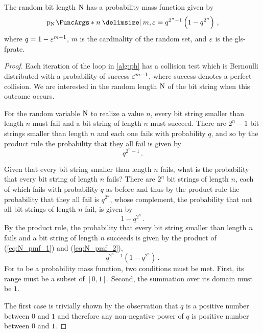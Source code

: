 \documentclass[ ../main.tex]{subfiles}
\begin{document}
\begin{theorem}
The random bit length $\mathrm{N}$ has a probability mass function given by
\begin{equation}
\label{eq:N_pmf}
    \PDF{n \Given m, \fprate}[\RV{N}] = q^{2^n-1}\left(1 - q^{2^n}\right)\,,
\end{equation}
where $q = 1 - \varepsilon^{m-1}$, $m$ is the cardinality of the random set, and $\varepsilon$ is the \gls{gls-fprate}.
\end{theorem}
\begin{proof}
Each iteration of the loop in \cref{alg:ph} has a collision test which is Bernoulli distributed with a probability of success $\varepsilon^{m-1}$, where success denotes a perfect collision. We are interested in the random length $\mathrm{N}$ of the bit string when this outcome occurs.

For the random variable $\mathrm{N}$ to realize a value $n$, every bit string smaller than length $n$ must fail and a bit string of length $n$ must succeed. There are $2^n-1$ bit strings smaller than length $n$ and each one fails with probability $q$, and so by the product rule the probability that they all fail is given by
\begin{equation}
\label{eq:N_pmf_1}
    q^{2^n - 1}\,.
\end{equation}

Given that every bit string smaller than length $n$ fails, what is the probability that every bit string of length $n$ fails? There are $2^n$ bit strings of length $n$, each of which fails with probability $q$ as before and thus by the product rule the probability that they all fail is $q^{2^n}$, whose complement, the probability that not all bit strings of length $n$ fail, is given by
\begin{equation}
\label{eq:N_pmf_2}
    1 - q^{2^n}\,.
\end{equation}
By the product rule, the probability that every bit string smaller than length $n$ fails and a bit string of length $n$ succeeds is given by the product of (\ref{eq:N_pmf_1}) and (\ref{eq:N_pmf_2}),
\begin{equation}
\label{eq:prob_is_mass}
    q^{2^n-1}\left(1 - q^{2^n}\right)\,.
\end{equation}
For  to be a probability mass function, two conditions must be met. First, its range must be a subset of $[0,1]$. Second, the summation over its domain must be $1$.

The first case is trivially shown by the observation that $q$ is a positive number between $0$ and $1$ and therefore any non-negative power of $q$ is positive number between $0$ and $1$.


\end{proof}
\end{document}
